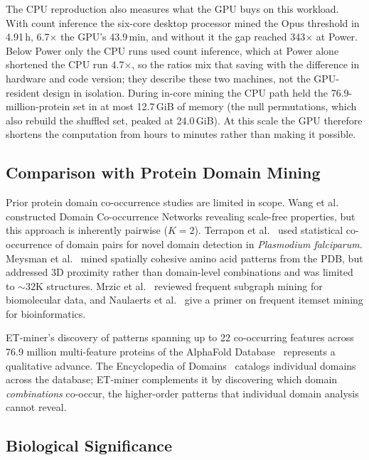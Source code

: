 \documentclass[10pt,a4paper,twocolumn]{article}
\begin{document}
The CPU reproduction also measures what the GPU buys on this workload. With count inference the six-core desktop processor mined the Opus threshold in 4.91\,h, 6.7$\times$ the GPU's 43.9\,min, and without it the gap reached 343$\times$ at Power. Below Power only the CPU runs used count inference, which at Power alone shortened the CPU run 4.7$\times$, so the ratios mix that saving with the difference in hardware and code version; they describe these two machines, not the GPU-resident design in isolation. During in-core mining the CPU path held the 76.9-million-protein set in at most 12.7\,GiB of memory (the null permutations, which also rebuild the shuffled set, peaked at 24.0\,GiB). At this scale the GPU therefore shortens the computation from hours to minutes rather than making it possible.

\subsection{Comparison with Protein Domain Mining}

Prior protein domain co-occurrence studies are limited in scope. Wang et al.~\cite{wang2011} constructed Domain Co-occurrence Networks revealing scale-free properties, but this approach is inherently pairwise ($K{=}2$). Terrapon et al.~\cite{coin2009} used statistical co-occurrence of domain pairs for novel domain detection in \emph{Plasmodium falciparum}. Meysman et al.~\cite{meysman2015} mined spatially cohesive amino acid patterns from the PDB, but addressed 3D proximity rather than domain-level combinations and was limited to ${\sim}32$K structures. Mrzic et al.~\cite{mrzic2018} reviewed frequent subgraph mining for biomolecular data, and Naulaerts et al.~\cite{naulaerts2015} give a primer on frequent itemset mining for bioinformatics.

ET-miner's discovery of patterns spanning up to 22 co-occurring features across 76.9 million multi-feature proteins of the AlphaFold Database~\cite{varadi2024} represents a qualitative advance. The Encyclopedia of Domains~\cite{barrio2024} catalogs individual domains across the database; ET-miner complements it by discovering which domain \emph{combinations} co-occur, the higher-order patterns that individual domain analysis cannot reveal.

\subsection{Biological Significance}
\end{document}
